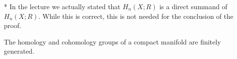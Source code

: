 \begin{remark}*
  In the lecture we actually stated that $H_n(X;R)$ is a direct
  summand of $H_n(X;R)$.
  While this is correct, this is not needed for the conclusion of the proof.
\end{remark}

\begin{corollary}
  \label{lm:co-homology-groups-of-compact-manifold-are-finitely-generated}
  The homology and cohomology groups of a compact manifold are finitely generated.
\end{corollary}
